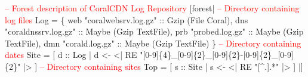 \begin{code}
\textcolor{red}{-- Forest description of CoralCDN Log Repository}
[forest|
  \textcolor{red}{-- Directory containing log files}
   Log = 
    \{ web  "coralwebsrv.log.gz" :: Gzip (File Coral),          
      dns  "coraldnssrv.log.gz" :: Maybe (Gzip TextFile),
      prb  "probed.log.gz"      :: Maybe (Gzip TextFile),
      dmn  "corald.log.gz"      :: Maybe (Gzip TextFile) \}
\mbox{}
  \textcolor{red}{-- Directory containing dates}
   Site = [ d :: Log | d <-  <| RE "[0-9]\{4\}\_[0-9]\{2\}\_[0-9]\{2\}-[0-9]\{2\}\_[0-9]\{2\}" |> ] 
\mbox{}
  \textcolor{red}{-- Directory containing sites}
   Top = [ s :: Site | s <-  <| RE "[^.].*" |> ] 
|]
\end{code}

